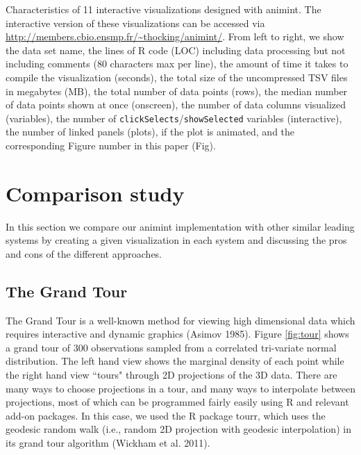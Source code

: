 \documentclass[12pt,]{article}
\theoremstyle{definition}
\theoremstyle{definition}
\theoremstyle{remark}
\begin{document}
\begin{table}[htp] %
  \centering
  
  \vskip 0.2cm
  \caption{Characteristics of 11 interactive visualizations designed with
    animint. The interactive version of these visualizations can be accessed 
    via \url{http://members.cbio.ensmp.fr/~thocking/animint/}.
    From left to right, we show the data set name, the
    lines of R code (LOC) including data processing but not including comments
    (80 characters max per line),
    the amount of time it takes to compile the visualization (seconds),
    the total size of the uncompressed TSV files in megabytes (MB),
    the total number of data points (rows),
    the median number of data points shown at once (onscreen),
    the number of data columns visualized (variables),
    the number of \texttt{clickSelects}/\texttt{showSelected} 
    variables (interactive),
    the number of linked panels (plots),
    if the plot is animated,
    and the corresponding Figure number in this paper (Fig).
  }
\label{tab:examples}
\end{table}

\section{Comparison study}\label{compare}

In this section we compare our animint implementation with other similar
leading systems by creating a given visualization in each system and
discussing the pros and cons of the different approaches.

\subsection{The Grand Tour}\label{tour}

The Grand Tour is a well-known method for viewing high dimensional data
which requires interactive and dynamic graphics (Asimov 1985). Figure
\ref{fig:tour} shows a grand tour of 300 observations sampled from a
correlated tri-variate normal distribution. The left hand view shows the
marginal density of each point while the right hand view ``tours"
through 2D projections of the 3D data. There are many ways to choose
projections in a tour, and many ways to interpolate between projections,
most of which can be programmed fairly easily using R and relevant
add-on packages. In this case, we used the R package tourr, which uses
the geodesic random walk (i.e., random 2D projection with geodesic
interpolation) in its grand tour algorithm (Wickham et al. 2011).
\end{document}
